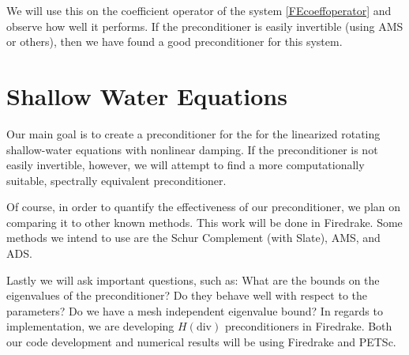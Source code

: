 \documentclass[11pt]{article}
\newcommand{\divv}{\mathrm{div}}
\begin{document}
 We will use this on the coefficient operator of the system \eqref{FEcoeffoperator} and observe how well it performs. If the preconditioner is easily invertible (using AMS or others), then we have found a good preconditioner for this system.


\section{Shallow Water Equations}
 Our main goal is to create a preconditioner for the for the linearized rotating shallow-water equations with nonlinear damping.
If the preconditioner is not easily invertible, however, we will attempt to find a more computationally suitable, spectrally equivalent preconditioner.

Of course, in order to quantify the effectiveness of our preconditioner, we plan on comparing it to other known methods. This work will be done in Firedrake. Some methods we intend to use are the Schur Complement (with Slate), AMS, and ADS.

Lastly we will ask important questions, such as:
What are the bounds on the eigenvalues of the preconditioner?
Do they behave well with respect to the parameters?
Do we have a mesh independent eigenvalue bound?
In regards to implementation, we are developing $H(\divv)$ preconditioners in Firedrake. Both our code development and numerical results will be using Firedrake and PETSc.
\end{document}
